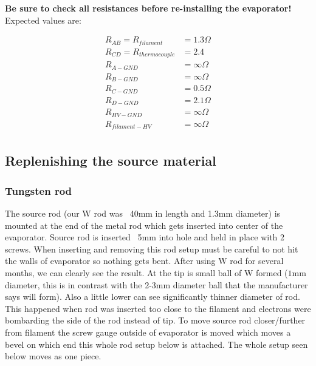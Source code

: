 \textbf{Be sure to check all resistances before re-installing the evaporator!} Expected values are:

\begin{align*}   %
R_{AB} = R_{filament} &= 1.3 \Omega \\ 
R_{CD} = R_{thermocouple} &= 2.4 \\%
R_{A-GND} &= \infty \Omega \\
R_{B-GND} &= \infty \Omega \\
R_{C-GND} &= 0.5 \Omega \\
R_{D-GND} &= 2.1 \Omega \\
R_{HV-GND} &= \infty \Omega \\
R_{filament-HV} &= \infty \Omega \\
\end{align*}



\subsection{Replenishing the source material}
\subsubsection*{Tungsten rod}
The source rod (our W rod was ~40mm in length and 1.3mm diameter) is mounted at the end of the metal rod which gets inserted into center of the evaporator. Source rod is inserted ~5mm into hole and held in place with 2 screws. When inserting and removing this rod setup must be careful to not hit the walls of evaporator so nothing gets bent. After using W rod for several months, we can clearly see the result. At the tip is small ball of W formed ($1$mm diameter, this is in contrast with the 2-3mm diameter ball that the manufacturer says will form). Also a little lower can see significantly thinner diameter of rod. This happened when rod was inserted too close to the filament and electrons were bombarding the side of the rod instead of tip.  To move source rod closer/further from filament the screw gauge outside of evaporator is moved which moves a bevel on which end this whole rod setup below is attached. The whole setup seen below moves as one piece.

